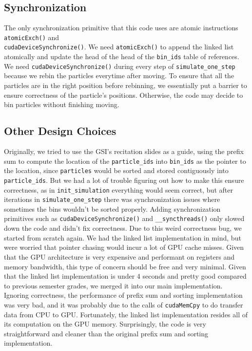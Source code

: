 \documentclass{article}
\begin{document}
\subsection{Synchronization}
The only synchronization primitive that this code uses are atomic instructions \verb|atomicExch()| and \\ \verb|cudaDeviceSynchronize()|. We need \verb|atomicExch()| to append the linked list atomically and update the head of the head of the \verb|bin_ids| table of references. We need \verb|cudaDeviceSynchronize()| during every step of \verb|simulate_one_step| because we rebin the particles everytime after moving. To ensure that all the particles are in the right position before rebinning, we essentially put a barrier to ensure correctness of the particle's positions. Otherwise, the code may decide to bin particles without finishing moving.

\subsection{Other Design Choices}
Originally, we tried to use the GSI's recitation slides as a guide, using the prefix sum to compute the location of the \verb|particle_ids| into \verb|bin_ids| as the pointer to the location, since \verb|particles| would be sorted and stored contiguously into \verb|particle_ids|. But we had a lot of trouble figuring out how to make this ensure correctness, as in \verb|init_simulation| everything would seem correct, but after iterations in \verb|simulate_one_step|  there was synchronization issues where sometimes the bins wouldn't be sorted properly. Adding synchronization primitives such as \verb|cudaDeviceSynchronize()| and \verb|__syncthreads()| only slowed down the code and didn't fix correctness. Due to this weird correctness bug, we started from scratch again. We had the linked list implementation in mind, but were worried that pointer chasing would incur a lot of GPU cache misses. Given that the GPU architecture is very expensive and performant on registers and memory bandwidth, this type of concern should be free and very minimal. Given that the linked list implementation is under 4 seconds and pretty good compared to previous semester grades, we merged it into our main implementation. Ignoring correctness, the performance of prefix sum and sorting implementation was very bad, and it was probably due to the calls of \verb|cudaMemCpy| to do transfer data from CPU to GPU. Fortunately, the linked list implementation resides all of its computation on the GPU memory. Surprisingly, the code is very straightforward and cleaner than the original prefix sum and sorting implementation.
\end{document}
